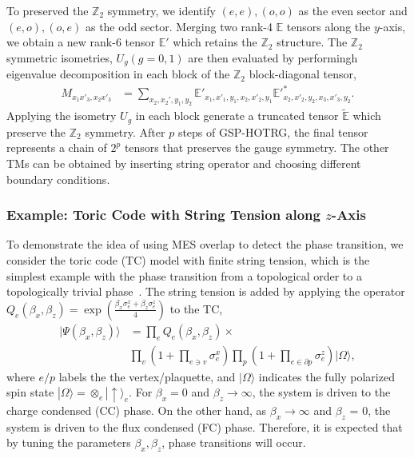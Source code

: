 \documentclass{ntuthesis}
\begin{document}
To preserved the $\mathbb{Z}_2$ symmetry, we identify  $(e,e), (o,o)$ as the even sector and $(e,o),(o,e)$ as the odd sector.
%
Merging two rank-4  $\mathbb{ E} $ tensors along the $y$-axis,  we obtain a new rank-6 tensor  $\mathbb{ E'}$ which retains the $\mathbb{ Z}_2 $ structure. 
%
The $\mathbb{ Z}_2 $ symmetric isometries, $U_g (g=0,1)$ are then evaluated by performingh eigenvalue decomposition in each block of the $\mathbb{ Z}_2$  block-diagonal tensor,
\begin{align}
M_{x_1  x'_3,  x_2  x'_3} 
&=  \sum_{x_2,x_2',y_1,y_2}
\mathbb{ E'}_{x_1,x'_1,y_1,x_2,x'_2,y_1} 
\mathbb{ E'}^*_{x_2,x'_2,y_2,x_3,x'_3,y_2}.   
\end{align}
Applying the isometry $U_g$  in each block generate a truncated tensor $\tilde{\mathbb{E}}$ which preserve the $\mathbb{Z}_2$ symmetry.
%
After $p$ steps of GSP-HOTRG, the final tensor represents a chain of  $2^p$ tensors that preserves the gauge symmetry.
%
The other TMs can be obtained by inserting string operator and choosing different boundary conditions. 


\subsubsection{Example: Toric Code with String Tension along $z$-Axis}
\label{subsubsec:Toric Code}
To demonstrate the idea of using MES overlap to detect the phase transition, we consider the toric code (TC) model with finite string tension, which is the simplest example with the phase transition from a topological order to a topologically trivial phase~\cite{Norbert_Schuch_2013,Haegeman_2015}.
%
The string tension is added by applying the operator $Q_e(\beta_x, \beta_z) = \exp \left(  \frac{  \beta_x \sigma^x_e + \beta_z \sigma^z_e }{4}  \right)$ to the TC, 
%
\begin{align}
|\Psi(\beta_x,\beta_z)\rangle &= \prod_{e} Q_e(\beta_x,\beta_z)\times \nonumber\\
 &\prod_{v}\left(1+\prod_{e \ni v} \sigma_{e}^{x}\right) \prod_{p}\left(1+\prod_{e \in \partial p} \sigma_{e}^{z}\right) |\Omega\rangle,
\end{align}
where $e/p$ labels the the vertex/plaquette, and $ |\Omega\rangle$ indicates  the fully polarized spin state $|\Omega\rangle=\otimes_{e}|\uparrow\rangle_{e}$.
%
%
For $ \beta_x =0$ and  $\beta_z \to \infty$, the system is driven to the charge condensed (CC) phase. 
%
On the other hand,  as $ \beta_x \to \infty $ and  $\beta_z $ = 0, the system is driven to the flux condensed (FC) phase.
%
 Therefore, it is expected that by tuning the parameters $ \beta_x, \beta_z$, phase transitions will occur.
%
\end{document}
